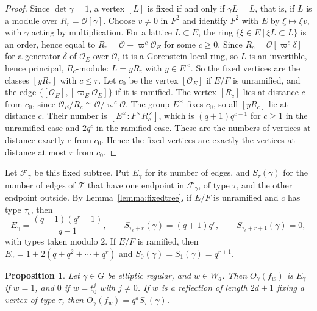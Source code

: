 \documentclass[12pt,letterpaper]{amsart}
\numberwithin{equation}{section}
\newtheorem{proposition}[theorem]{Proposition}
\theoremstyle{definition}
\theoremstyle{remark}
\newcommand{\cO}{\mathcal{O}}
\begin{document}
\begin{proof}
Since $\det\gamma=1$, a vertex $[L]$ is fixed if and only if $\gamma
L=L$, that is, if $L$ is a module over $R_r=\cO[\gamma]$. Choose
$v\neq0$ in $F^2$ and identify $F^2$ with $E$ by $\xi\mapsto\xi v$, with
$\gamma$ acting by multiplication. For a lattice $L\subset E$, the ring
$\{\xi\in E\ |\ \xi L\subset L\}$ is an order, hence equal to
$R_c=\cO+\varpi^c\cO_E$ for some $c\geq0$. Since $R_c=\cO[\varpi^c\delta]$
for a generator $\delta$ of $\cO_E$ over $\cO$, it is a Gorenstein local
ring, so $L$ is an invertible, hence principal, $R_c$-module:
$L=yR_c$ with $y\in E^\times$. So the fixed vertices are the classes
$[yR_c]$ with $c\leq r$. Let $c_0$ be the vertex $[\cO_E]$ if $E/F$ is
unramified, and the edge $\{[\cO_E],[\varpi_E\cO_E]\}$ if it is
ramified. The vertex $[R_c]$ lies at distance $c$ from $c_0$, since
$\cO_E/R_c\cong\cO/\varpi^c\cO$. The group $E^\times$ fixes $c_0$, so
all $[yR_c]$ lie at distance $c$. Their number is
$[E^\times:F^\times R_c^\times]$, which is $(q+1)q^{c-1}$ for $c\geq1$
in the unramified case and $2q^c$ in the ramified case. These are the
numbers of vertices at distance exactly $c$ from $c_0$. Hence the fixed
vertices are exactly the vertices at distance at most $r$ from $c_0$.
\end{proof}

Let $\mathcal F_\gamma$ be this fixed subtree. Put $E_\gamma$ for its
number of edges, and $S_\tau(\gamma)$ for the number of edges of
$\mathcal T$ that have one endpoint in $\mathcal F_\gamma$, of type
$\tau$, and the other endpoint outside. By
Lemma~\ref{lemma:fixedtree}, if $E/F$ is unramified and $c$ has type
$\tau_c$, then
\[
E_\gamma=\frac{(q+1)(q^r-1)}{q-1},\qquad S_{\tau_c+r}(\gamma)=(q+1)q^r,
\qquad S_{\tau_c+r+1}(\gamma)=0,
\]
with types taken modulo $2$. If $E/F$ is ramified, then
$E_\gamma=1+2(q+q^2+\cdots+q^r)$ and $S_0(\gamma)=S_1(\gamma)=q^{r+1}$.

\begin{proposition}
\label{prop:ellsl2}
Let $\gamma\in G$ be elliptic regular, and $w\in W_a$. Then
$O_\gamma(f_w)$ is $E_\gamma$ if $w=1$, and $0$ if $w=t_0^j$ with
$j\neq0$. If $w$ is a reflection of length $2d+1$ fixing a vertex of
type $\tau$, then $O_\gamma(f_w)=q^dS_\tau(\gamma)$.
\end{proposition}
\end{document}
